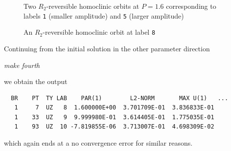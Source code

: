 \documentclass[12pt]{report}
\begin{document}
\begin{figure}[p]
\epsfysize 9.0cm
\centerline{}
\caption{Two $R_2$-reversible homoclinic orbits at $P=1.6$ 
corresponding to labels {\tt 1} (smaller amplitude) and {\tt 5} (larger amplitude)}
\label{Frev3}
\end{figure}
\begin{figure}[p]
\epsfysize 9.0cm
\centerline{}
\caption{An $R_2$-reversible homoclinic orbit at label {\tt 8}}
\label{Frev4}
\end{figure}

Continuing from the initial solution in the other parameter direction
\begin{center}
\it make fourth
\end{center}
we obtain the output
\begin{verbatim}
  BR    PT  TY LAB    PAR(1)        L2-NORM       MAX U(1)   ...
   1     7  UZ   8  1.600000E+00  3.701709E-01  3.836833E-01  
   1    33  UZ   9  9.999980E-01  3.614405E-01  1.775035E-01  
   1    93  UZ  10 -7.819855E-06  3.713007E-01  4.698309E-02  
\end{verbatim}
which again ends at a no convergence error for similar reasons.




\newpage
\end{document}
